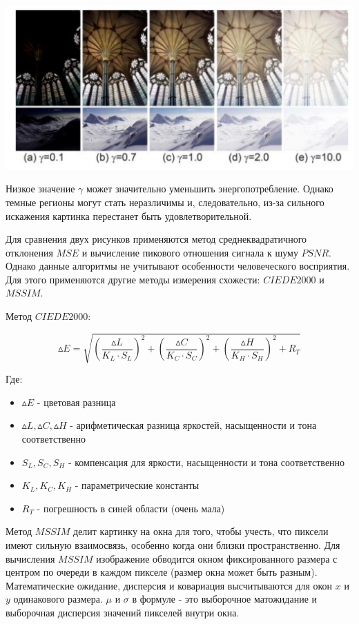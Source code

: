 \documentclass[a4paper, 12pt]{article}
\begin{document}
	\includegraphics[scale=0.4]{3}
	
	Низкое значение $\gamma$ может значительно уменьшить энергопотребление. Однако темные регионы могут стать неразличимы и, следовательно, из-за сильного искажения картинка перестанет быть удовлетворительной. 
	
	Для сравнения двух рисунков применяются метод среднеквадратичного отклонения $MSE$ и вычисление пикового отношения сигнала к шуму $PSNR$. Однако данные алгоритмы не учитывают особенности человеческого восприятия. Для этого применяются другие методы измерения схожести: $CIEDE2000$ и $MSSIM$.
	
	Метод $CIEDE2000$:
	
	\[\vartriangle E=\sqrt{\left(\frac{\vartriangle L}{K_L\cdot S_L}\right)^2 + \left(\frac{\vartriangle C}{K_C\cdot S_C}\right)^2 + \left(\frac{\vartriangle H}{K_H\cdot S_H}\right)^2 + R_T}\]
	
	Где:
	\begin{itemize}
		\item $\vartriangle{E}$ - цветовая разница
		\item $\vartriangle L, \vartriangle C, \vartriangle H$ - арифметическая разница яркостей, насыщенности и тона соответственно
		\item $S_L, S_C, S_H$ - компенсация для  яркости, насыщенности и тона соответственно
		\item $K_L, K_C, K_H$ - параметрические константы
		\item $R_T$ - погрешность в синей области (очень мала)
	\end{itemize}
	
	Метод $MSSIM$ делит картинку на окна для того, чтобы учесть, что пиксели имеют сильную взаимосвязь, особенно когда они близки пространственно. Для вычисления $MSSIM$ изображение обводится окном фиксированного размера с центром по очереди в каждом пикселе (размер окна может быть разным). Математические ожидание, дисперсия и ковариация высчитываются для окон $x$ и $y$ одинакового размера. $\mu$ и $\sigma$ в формуле - это выборочное матожидание и выборочная дисперсия значений пикселей внутри окна.
\end{document}

